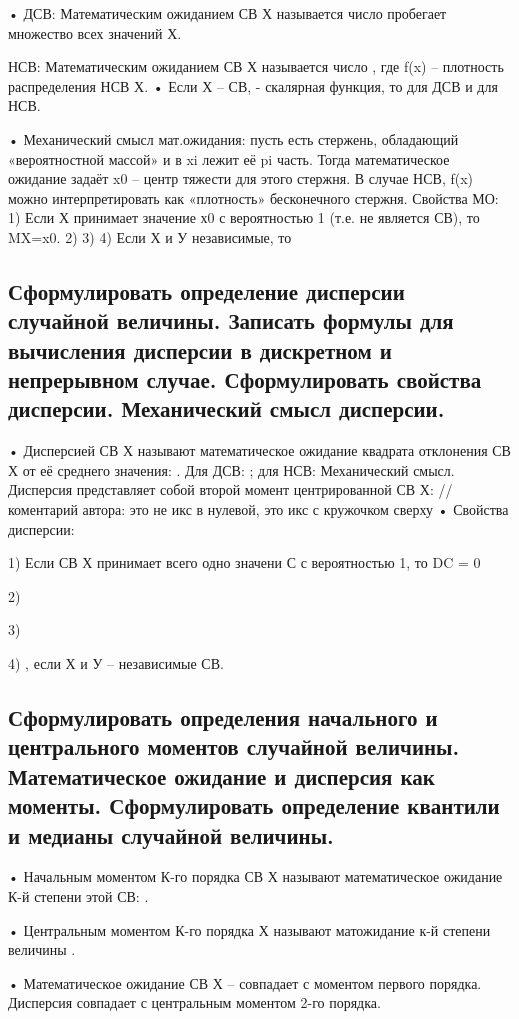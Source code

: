 • ДСВ: Математическим ожиданием СВ Х называется число  пробегает множество всех значений Х.

НСВ: Математическим ожиданием СВ Х называется число , где f(x) – плотность распределения НСВ Х.
• Если Х – СВ,  - скалярная функция, то  для ДСВ и  для НСВ.

• Механический смысл мат.ожидания: пусть есть стержень, обладающий «вероятностной массой» и в xi лежит её pi часть. Тогда математическое ожидание задаёт x0 – центр тяжести для этого стержня. В случае НСВ, f(x) можно интерпретировать как «плотность» бесконечного стержня.
Свойства МО:
1) Если Х принимает значение х0 с вероятностью 1 (т.е. не является СВ), то MX=x0.
2) 
3) 
4) Если Х и У независимые, то 

\subsection{Сформулировать определение дисперсии случайной величины. Записать формулы для вычисления дисперсии в дискретном и непрерывном случае. Сформулировать свойства дисперсии. Механический смысл дисперсии.}

• Дисперсией СВ Х называют математическое ожидание квадрата отклонения СВ Х от её среднего значения: .
Для ДСВ: ;    для НСВ: 
Механический смысл. Дисперсия представляет собой второй момент центрированной СВ Х:  //коментарий автора: это не икс в нулевой, это икс с кружочком сверху
• Свойства дисперсии:

1) Если СВ Х принимает всего одно значени С с вероятностью 1, то DC = 0

2) 

3) 

4) , если Х и У – независимые СВ.

\subsection{Сформулировать определения начального и центрального моментов случайной величины. Математическое ожидание и дисперсия как моменты. Сформулировать определение квантили и медианы случайной величины.}

• Начальным моментом К-го порядка СВ Х называют математическое ожидание К-й степени этой СВ:  .

• Центральным моментом К-го порядка Х называют матожидание к-й степени величины .

• Математическое ожидание СВ Х – совпадает с моментом первого порядка. Дисперсия совпадает с центральным моментом 2-го порядка.

